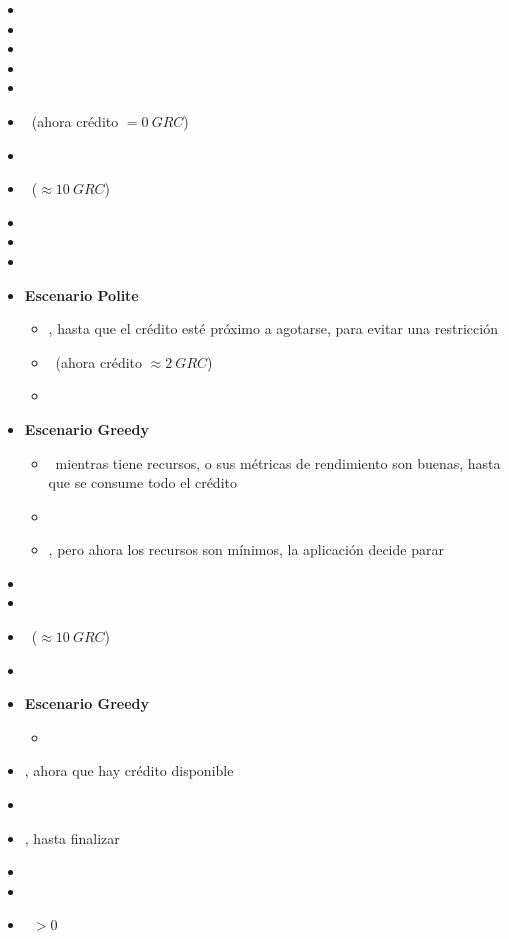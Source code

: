 \documentclass[preprint,3p]{elsarticle}
\begin{document}
\begin{itemize}
	\setlength\itemsep{0em}
	\item \ContainerUp
	\item \UserNoCredit
	\item \UserAccountingActivated
	\item \AccountingRestricts
	\item \AppStart
	\item \AppWaits~(ahora crédito $= 0~GRC$)
	\item \DataGenerationPartial
	\item \UserSendsCredit~($\approx 10~GRC$)
	\item \AccountingAllows
	\item \AppResume
	\item \ServerlessAdapts
	
	\item \textbf{Escenario Polite}
	\begin{itemize}
		\item \AppRuns, hasta que el crédito esté próximo a agotarse, para evitar una restricción
		\item \AppWaits~(ahora crédito $\approx 2~GRC$)
		\item \ServerlessDown
	\end{itemize}

	\item \textbf{Escenario Greedy}
	\begin{itemize}
		\item \AppRuns~mientras tiene recursos, o sus métricas de rendimiento son buenas, hasta que se consume todo el crédito 
		\item \AccountingRestricts
		\item \AppRuns, pero ahora los recursos son mínimos, la aplicación decide parar
	\end{itemize}

	\item \AccountingIdle
	\item \Wait
	\item \UserSendsCredit~($\approx 10~GRC$)
	\item \DataGenerationPartial

	\item \textbf{Escenario Greedy}
	\begin{itemize}
		\item \AccountingAllows
	\end{itemize}	

	\item \AppResume, ahora que hay crédito disponible
	\item \ServerlessAdapts
	\item \AppRuns, hasta finalizar
	\item \ServerlessDown
	\item \AccountingIdle
	\item \AccountingCredit~$> 0$
\end{itemize}
\end{document}
